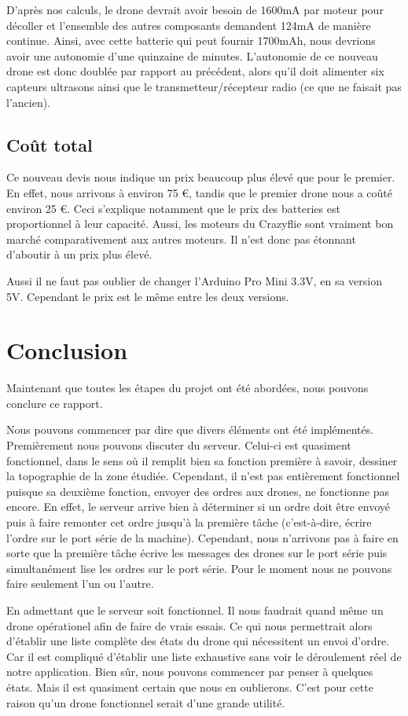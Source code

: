 \documentclass[a4paper,10pt]{report}
\begin{document}
      D'après nos calculs, le drone devrait avoir besoin de 1600mA par moteur 
pour décoller et l'ensemble des autres composants demandent 124mA de manière 
continue. Ainsi, avec cette batterie qui peut fournir 1700mAh, nous devrions 
avoir une autonomie d'une quinzaine de minutes. L'autonomie de ce nouveau drone 
est donc doublée par rapport au précédent, alors qu'il doit alimenter six 
capteurs ultrasons ainsi que le transmetteur/récepteur radio (ce que ne faisait 
pas l'ancien).

    \section{Coût total}
      Ce nouveau devis nous indique un prix beaucoup plus élevé que pour le 
premier. En effet, nous arrivons à environ 75 \euro, tandis que le premier 
drone nous a coûté environ 25 \euro. Ceci s'explique notamment que le prix des 
batteries est proportionnel à leur capacité. Aussi, les moteurs du Crazyflie 
sont vraiment bon marché comparativement aux autres moteurs. Il n'est donc 
pas étonnant d'aboutir à un prix plus élevé.

      Aussi il ne faut pas oublier de changer l'Arduino Pro Mini 3.3V, en sa 
version 5V. Cependant le prix est le même entre les deux versions.
  
  \chapter{Conclusion}
    Maintenant que toutes les étapes du projet ont été abordées, nous pouvons 
conclure ce rapport.

    Nous pouvons commencer par dire que divers éléments ont été implémentés. 
Premièrement nous pouvons discuter du serveur. Celui-ci est quasiment 
fonctionnel, dans le sens où il remplit bien sa fonction première à savoir, 
dessiner la topographie de la zone étudiée. Cependant, il n'est pas entièrement 
fonctionnel puisque sa deuxième fonction, envoyer des ordres aux drones, ne 
fonctionne pas encore. En effet, le serveur arrive bien à déterminer si un 
ordre doit être envoyé puis à faire remonter cet ordre jusqu'à la première 
tâche (c'est-à-dire, écrire l'ordre sur le port série de la machine). 
Cependant, nous n'arrivons pas à faire en sorte que la première tâche écrive 
les messages des drones sur le port série puis simultanément lise les ordres 
sur le port série. Pour le moment nous ne pouvons faire seulement l'un ou 
l'autre.

    En admettant que le serveur soit fonctionnel. Il nous faudrait quand même 
un drone opérationel afin de faire de vrais essais. Ce qui nous permettrait 
alors d'établir une liste complète des états du drone qui nécessitent un envoi 
d'ordre. Car il est compliqué d'établir une liste exhaustive sans voir le 
déroulement réel de notre application. Bien sûr, nous pouvons commencer par 
penser à quelques états. Mais il est quasiment certain que nous en oublierons. 
C'est pour cette raison qu'un drone fonctionnel serait d'une grande utilité. 
\end{document}
